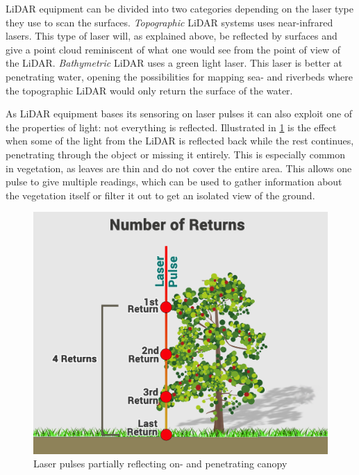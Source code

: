         LiDAR equipment can be divided into two categories depending on the laser type they use to scan the surfaces. \emph{Topographic} LiDAR systems uses near-infrared lasers. This type of laser will, as explained above, be reflected by surfaces and give a point cloud reminiscent of what one would see from the point of view of the LiDAR. \emph{Bathymetric} LiDAR uses a green light laser. This laser is better at penetrating water, opening the possibilities for mapping sea- and riverbeds where the topographic LiDAR would only return the surface of the water.
        
        As LiDAR equipment bases its sensoring on laser pulses it can also exploit one of the properties of light: not everything is reflected\cite{lidar_canopy}. Illustrated in \cref{fig:transmission} is the effect when some of the light from the LiDAR is reflected back while the rest continues, penetrating through the object or missing it entirely. This is especially common in vegetation, as leaves are thin and do not cover the entire area. This allows one pulse to give multiple readings, which can be used to gather information about the vegetation itself or filter it out to get an isolated view of the ground.
        
        \FloatBarrier
        \begin{figure}[ht]
            \centering
            \includegraphics[width=0.5\linewidth]{figures/lidar.png}
            \caption{Laser pulses partially reflecting on- and penetrating canopy}
            \label{fig:transmission}
        \end{figure}
        \FloatBarrier
        
